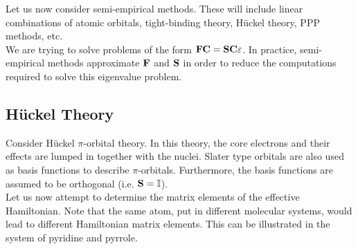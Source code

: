 \documentclass[12pt,a4paper,titlepage]{article}
\newcommand{\id}{\mathbb{I}} %
\begin{document}
Let us now consider semi-empirical methods. These will include linear combinations of atomic orbitals, tight-binding theory, H\"{u}ckel theory, PPP methods, etc.\\

We are trying to solve problems of the form $\vb{FC}=\vb{SC\varepsilon}$. In practice, semi-empirical methods approximate $\vb{F}$ and $\vb{S}$ in order to reduce the computations required to solve this eigenvalue problem.\\

\subsection{H\"{u}ckel Theory}
Consider H\"{u}ckel $\pi$-orbital theory. In this theory, the core electrons and their effects are lumped in together with the nuclei. Slater type orbitals are also used as basis functions to describe $\pi$-orbitals. Furthermore, the basis functions are assumed to be orthogonal (i.e. $\vb{S}=\id$).\\

Let us now attempt to determine the matrix elements of the effective Hamiltonian. Note that the same atom, put in different molecular systems, would lead to different Hamiltonian matrix elements. This can be illustrated in the system of pyridine and pyrrole.

\begin{center}
\end{center}
\end{document}
